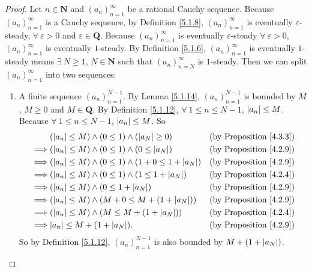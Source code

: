 \begin{proof}
Let \(n \in \mathbf{N}\) and \((a_n)_{n = 1}^{\infty}\) be a rational Cauchy sequence.
Because \((a_n)_{n = 1}^{\infty}\) is a Cauchy sequence, by Definition \ref{5.1.8}, \((a_n)_{n = 1}^{\infty}\) is eventually \(\varepsilon\)-steady, \(\forall\ \varepsilon > 0\) and \(\varepsilon \in \mathbf{Q}\).
Because \((a_n)_{n = 1}^{\infty}\) is eventually \(\varepsilon\)-steady \(\forall\ \varepsilon > 0\), \((a_n)_{n = 1}^{\infty}\) is eventually \(1\)-steady.
By Definition \ref{5.1.6}, \((a_n)_{n = 1}^{\infty}\) is eventually \(1\)-steady means \(\exists\ N \geq 1\), \(N \in \mathbf{N}\) such that \((a_n)_{n = N}^{\infty}\) is \(1\)-steady.
Then we can split \((a_n)_{n = 1}^{\infty}\) into two sequences:
\begin{enumerate}
    \item A finite sequence \((a_n)_{n = 1}^{N - 1}\).
    By Lemma \ref{5.1.14}, \((a_n)_{n = 1}^{N - 1}\) is bounded by \(M\), \(M \geq 0\) and \(M \in \mathbf{Q}\).
    By Definition \ref{5.1.12}, \(\forall\ 1 \leq n \leq N - 1\), \(\abs*{a_n} \leq M\).
    Because \(\forall\ 1 \leq n \leq N - 1\), \(\abs*{a_n} \leq M\).
    So
    \begin{align*}
    & (\abs*{a_n} \leq M) \land (0 \leq 1) \land (\abs*{a_N} \geq 0) & \text{(by Proposition \ref{4.3.3})} \\
    \implies & (\abs*{a_n} \leq M) \land (0 \leq 1) \land (0 \leq \abs*{a_N}) & \text{(by Proposition \ref{4.2.9})} \\
    \implies & (\abs*{a_n} \leq M) \land (0 \leq 1) \land (1 + 0 \leq 1 + \abs*{a_N}) & \text{(by Proposition \ref{4.2.9})} \\
    \implies & (\abs*{a_n} \leq M) \land (0 \leq 1) \land (1 \leq 1 + \abs*{a_N}) & \text{(by Proposition \ref{4.2.4})} \\
    \implies & (\abs*{a_n} \leq M) \land (0 \leq 1 + \abs*{a_N}) & \text{(by Proposition \ref{4.2.9})} \\
    \implies & (\abs*{a_n} \leq M) \land (M + 0 \leq M + (1 + \abs*{a_N})) & \text{(by Proposition \ref{4.2.9})} \\
    \implies & (\abs*{a_n} \leq M) \land (M \leq M + (1 + \abs*{a_N})) & \text{(by Proposition \ref{4.2.4})} \\
    \implies & \abs*{a_n} \leq  M + (1 + \abs*{a_N}). & \text{(by Proposition \ref{4.2.9})}
    \end{align*}
    So by Definition \ref{5.1.12}, \((a_n)_{n = 1}^{N - 1}\) is also bounded by \(M + (1 + \abs*{a_N})\).

\end{enumerate}
\end{proof}
